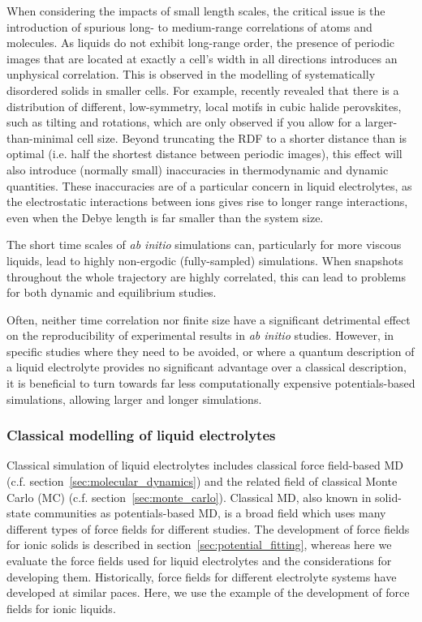 \documentclass[../main.tex]{subfiles}
\begin{document}
When considering the impacts of small length scales, the critical issue is the introduction of spurious long- to medium-range correlations of atoms and molecules. As liquids do not exhibit long-range order, the presence of periodic images that are located at exactly a cell's width in all directions introduces an unphysical correlation. This is observed in the modelling of systematically disordered solids in smaller cells.\cite{Morgan_2011} For example, \citeauthor{Zhao_2020} recently revealed that there is a distribution of different, low-symmetry, local motifs in cubic halide perovskites, such as tilting and rotations, which are only observed if you allow for a larger-than-minimal cell size.\cite{Zhao_2020} Beyond truncating the RDF to a shorter distance than is optimal (i.e. half the shortest distance between periodic images), this effect will also introduce (normally small) inaccuracies in thermodynamic and dynamic quantities.\cite{Binder2009book, yeh_system-size_2004, botan_diffusion_2015, horbach_finite_1996} These inaccuracies are of a particular concern in liquid electrolytes, as the electrostatic interactions between ions gives rise to longer range interactions, even when the Debye length is far smaller than the system size.\cite{coles_correlation_2020}

The short time scales of \textit{ab initio} simulations can, particularly for more viscous liquids, lead to highly non-ergodic (fully-sampled) simulations. When snapshots throughout the whole trajectory are highly correlated,\cite{frenkel_understanding_2002} this can lead to problems for both dynamic and equilibrium studies. 

Often, neither time correlation nor finite size have a significant detrimental effect on the reproducibility of experimental results in \textit{ab initio} studies. However, in specific studies where they need to be avoided, or where a quantum description of a liquid electrolyte provides no significant advantage over a classical description, it is beneficial to turn towards far less computationally expensive potentials-based simulations, allowing larger and longer simulations.

\subsubsection{Classical modelling of liquid electrolytes}
\label{sec:electrolyte_classicMD}
Classical simulation of liquid electrolytes includes classical force field-based MD (c.f. section~\ref{sec:molecular_dynamics}) and the related field of classical Monte Carlo (MC) (c.f. section~\ref{sec:monte_carlo}). Classical MD, also known in solid-state communities as potentials-based MD, is a broad field which uses many different types of force fields for different studies. The development of force fields for ionic solids is described in section~\ref{sec:potential_fitting}, whereas here we evaluate the force fields used for liquid electrolytes and the considerations for developing them. Historically, force fields for different electrolyte systems have developed at similar paces. Here, we use the example of the development of force fields for ionic liquids.
\end{document}
